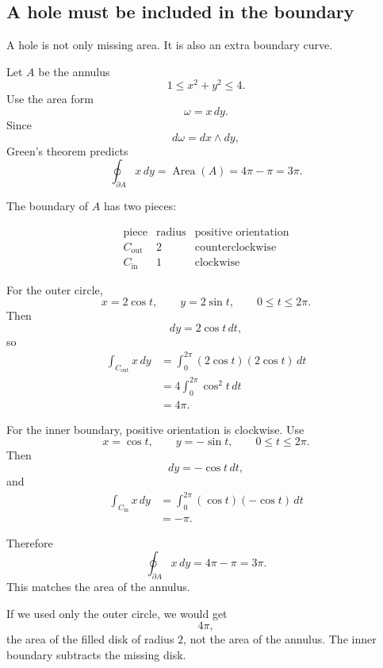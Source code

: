 \subsection{A hole must be included in the boundary}

A hole is not only missing area.  It is also an extra boundary curve.

Let \(A\) be the annulus
\[
    1\le x^2+y^2\le4.
\]
Use the area form
\[
    \omega=x\,dy.
\]
Since
\[
    d\omega=dx\wedge dy,
\]
Green's theorem predicts
\[
    \oint_{\partial A}x\,dy
    =
    \operatorname{Area}(A)
    =
    4\pi-\pi
    =
    3\pi.
\]

The boundary of \(A\) has two pieces:

\[
\begin{array}{c|c|c}
\text{piece} & \text{radius} & \text{positive orientation}\\ \hline
C_{\mathrm{out}} & 2 & \text{counterclockwise}\\[1mm]
C_{\mathrm{in}} & 1 & \text{clockwise}
\end{array}
\]

For the outer circle,
\[
    x=2\cos t,
    \qquad
    y=2\sin t,
    \qquad
    0\le t\le2\pi.
\]
Then
\[
    dy=2\cos t\,dt,
\]
so
\[
\begin{aligned}
    \int_{C_{\mathrm{out}}}x\,dy
    &=
    \int_0^{2\pi}(2\cos t)(2\cos t)\,dt\\
    &=
    4\int_0^{2\pi}\cos^2t\,dt\\
    &=
    4\pi.
\end{aligned}
\]

For the inner boundary, positive orientation is clockwise.  Use
\[
    x=\cos t,
    \qquad
    y=-\sin t,
    \qquad
    0\le t\le2\pi.
\]
Then
\[
    dy=-\cos t\,dt,
\]
and
\[
\begin{aligned}
    \int_{C_{\mathrm{in}}}x\,dy
    &=
    \int_0^{2\pi}(\cos t)(-\cos t)\,dt\\
    &=
    -\pi.
\end{aligned}
\]

Therefore
\[
\boxed{
    \oint_{\partial A}x\,dy
    =
    4\pi-\pi
    =
    3\pi.
}
\]
This matches the area of the annulus.

If we used only the outer circle, we would get
\[
    4\pi,
\]
the area of the filled disk of radius \(2\), not the area of the annulus.  The inner
boundary subtracts the missing disk.

